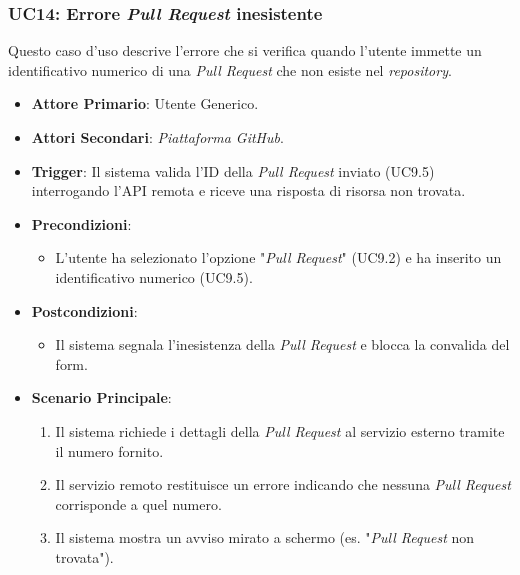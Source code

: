\documentclass[12pt, a4paper]{article}
\begin{document}
\subsubsection{UC14: Errore \textit{Pull Request} inesistente}\label{uc:14}
Questo caso d'uso descrive l'errore che si verifica quando l'utente immette un identificativo numerico di una \textit{Pull Request} che non esiste nel \textit{repository}.
\begin{itemize}
    \item \textbf{Attore Primario}: Utente Generico.
    \item \textbf{Attori Secondari}: \textit{Piattaforma GitHub}.
    \item \textbf{Trigger}: Il sistema valida l'ID della \textit{Pull Request} inviato (UC9.5) interrogando l'API remota e riceve una risposta di risorsa non trovata.
    \item \textbf{Precondizioni}:\begin{itemize}\item L'utente ha selezionato l'opzione "\textit{Pull Request}" (UC9.2) e ha inserito un identificativo numerico (UC9.5).\end{itemize}
    \item \textbf{Postcondizioni}:\begin{itemize}\item Il sistema segnala l'inesistenza della \textit{Pull Request} e blocca la convalida del form.\end{itemize}
    \item \textbf{Scenario Principale}:
    \begin{enumerate}
        \item Il sistema richiede i dettagli della \textit{Pull Request} al servizio esterno tramite il numero fornito.
        \item Il servizio remoto restituisce un errore indicando che nessuna \textit{Pull Request} corrisponde a quel numero.
        \item Il sistema mostra un avviso mirato a schermo (es. "\textit{Pull Request} non trovata").
    \end{enumerate}
\end{itemize}
\end{document}
